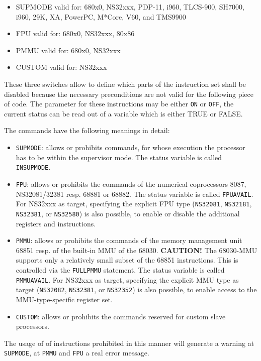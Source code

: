 \documentclass[12pt,twoside]{report}
\newcommand{\bb}[1]{{\bf #1}}
\newcommand{\tty}[1]{{\tt #1}}
\begin{document}
{\em
\begin{itemize}
\item{SUPMODE valid for: 680x0, NS32xxx, PDP-11, i960, TLCS-900,
      SH7000, i960, 29K, XA, PowerPC, M*Core, V60, and TMS9900}
\item{FPU valid for: 680x0, NS32xxx, 80x86}
\item{PMMU valid for: 680x0, NS32xxx}
\item{CUSTOM valid for: NS32xxx}
\end{itemize}
}

These three switches allow to define which parts of the instruction set
shall be disabled because the necessary preconditions are not valid for
the following piece of code.  The parameter for these instructions may be
either \tty{ON} or \tty{OFF}, the current status can be read out of a
variable which is either TRUE or FALSE.

The commands have the following meanings in detail:
\begin{itemize}
\item{\tty{SUPMODE}: allows or prohibits commands, for whose execution the
      processor has to be within the supervisor mode.  The status
      variable is called \tty{INSUPMODE}.}
\item{\tty{FPU}: allows or prohibits the commands of the numerical
      coprocessors 8087, NS32081/32381 resp. 68881 or 68882.  The status
      variable is called \tty{FPUAVAIL}.  For NS32xxx as target, specifying
      the explicit FPU type (\tty{NS32081}, \tty{NS32181}, \tty{NS32381},
      or \tty{NS32580}) is also possible, to enable or disable the additional
      registers and instructions.}
\item{\tty{PMMU}: allows or prohibits the commands of the memory
      management unit 68851 resp. of  the built-in MMU of the 68030.
      \bb{CAUTION!} The 68030-MMU supports only a relatively small subset
      of the 68851 instructions.  This is controlled via the \tty{FULLPMMU}
      statement. The status variable is called \tty{PMMUAVAIL}. For NS32xxx
      as target, specifying the explicit MMU type as target (\tty{NS32082},
      \tty{NS32381}, or \tty{NS32352}) is also possible, to enable access to
      the MMU-type-specific register set.}
\item{\tty{CUSTOM}: allows or prohibits the commands reserved for custom
      slave processors.}
\end{itemize}
The usage of of instructions prohibited in this manner will generate a
warning at \tty{SUPMODE}, at \tty{PMMU} and \tty{FPU} a real error
message.
\end{document}
